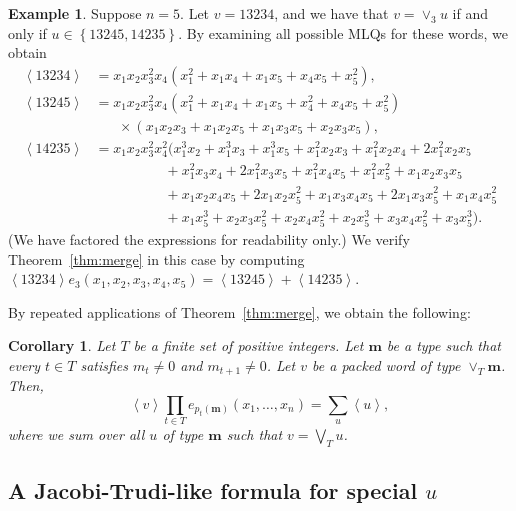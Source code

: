 \documentclass[reqno]{amsart}
\newcommand{\0}{\phantom{c}}
\newcommand{\swt}[1]{\left\langle #1 \right\rangle} %
\newcommand{\merge}[1]{\vee_{#1}} %
\newcommand{\mm}{\mathbf{m}}
\let\sumnonlimits\sum
\let\prodnonlimits\prod
\renewcommand{\sum}{\sumnonlimits\limits}
\renewcommand{\prod}{\prodnonlimits\limits}
\newcommand{\set}[1]{\left\{ #1 \right\}}
\theoremstyle{plain}
\newtheorem{cor}[thm]{Corollary}
\theoremstyle{definition}
\newtheorem{example}[thm]{Example}
\numberwithin{equation}{section}
\begin{document}
\begin{example}
Suppose $n = 5$.
Let $v = 13234$, and we have that $v = \merge{3} u$ if and only if $u \in \set{13245, 14235}$.
By examining all possible MLQs for these words, we obtain
\begin{align*}
\swt{13234} & = x_1 x_2 x_3^2 x_4 (x_1^2 + x_1 x_4 + x_1 x_5 + x_4 x_5 + x_5^2),
\\ \swt{13245} & = x_1 x_2 x_3^2 x_4 (x_1^2 + x_1x_4 + x_1x_5 + x_4^2 + x_4x_5 + x_5^2)
\\ & \hspace{20pt} \times (x_1x_2x_3 + x_1x_2x_5+x_1x_3x_5+x_2x_3x_5),
\\ \swt{14235} & = x_1x_2x_3^2x_4^2 (x_1^3x_2 + x_1^3x_3 + x_1^3x_5 + x_1^2x_2x_3 + x_1^2x_2x_4 + 2x_1^2x_2x_5
\\ & \hspace{60pt} + x_1^2x_3x_4 + 2x_1^2x_3x_5 + x_1^2x_4x_5 + x_1^2x_5^2 + x_1x_2x_3x_5
\\ & \hspace{60pt} + x_1x_2x_4x_5 + 2x_1x_2x_5^2 + x_1x_3x_4x_5 + 2x_1x_3x_5^2 + x_1x_4x_5^2
\\ & \hspace{60pt} + x_1x_5^3 + x_2x_3x_5^2 + x_2x_4x_5^2 + x_2x_5^3 + x_3x_4x_5^2 + x_3x_5^3).
\end{align*}
(We have factored the expressions for readability only.)
We verify Theorem~\ref{thm:merge} in this case by computing $\swt{13234} e_3(x_1, x_2, x_3, x_4, x_5) = \swt{13245} + \swt{14235}$.
\end{example}

By repeated applications of Theorem~\ref{thm:merge}, we obtain the following:

\begin{cor}
\label{cor:merges}
  Let $T$ be a finite set of positive integers.
  Let $\mm$ be a type such that every $t \in T$ satisfies
  $m_t \neq 0$ and $m_{t+1} \neq 0$.
  Let $v$ be a packed word of type $\merge{T}\mm$.
  Then,
  \[
  \swt{v} \prod_{t \in T} e_{p_t(\mm)}(x_1, \dotsc, x_n) = \sum_u \swt{u},
  \]
where we sum over all $u$ of type $\mm$ such that $v = \bigvee_T u$.
\end{cor}

\subsection{A Jacobi-Trudi-like formula for special $u$}
\label{subsec:JT_formula}
\end{document}
